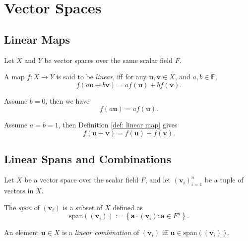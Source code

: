 
\chapter{Vector Spaces}


\section{Linear Maps}



\begin{definition}
	\label{def: linear map}
	Let $X$ and $Y$ be vector spaces over the same scalar field $F$.
	
	A map $f: X \to Y$ is said to be \textit{linear}, iff for any $\mathbf u, \mathbf v \in X$, and $a, b \in \mathbb F$,
	$$
	f(a\mathbf u + b\mathbf v) = a f(\mathbf u) + b f(\mathbf v).
	$$
\end{definition}



\begin{note}
	Assume $b = 0$, then we have
	$$
	f(a\mathbf u) = a f(\mathbf u).
	$$

	Assume $a = b = 1$, then Definition \ref{def: linear map} gives
	$$
	f(\mathbf u + \mathbf v) = f(\mathbf u) + f(\mathbf v).
	$$	
\end{note}





\section{Linear Spans and Combinations}


\begin{definition}
	\label{def: span and combination}
	Let $X$ be a vector space over the scalar field $F$, and let $(\mathbf v_i)_{i = 1}^n$ be a tuple of vectors in $X$.
	
	The \textit{span} of $(\mathbf v_i)$ is a subset of $X$ defined as
	$$
	\mathrm{span}((\mathbf v_i)) := \left\{ \mathbf a \cdot (\mathbf v_i) : \mathbf a \in F^n \right\}.
	$$
	
	An element $\mathbf u \in X$ is a \textit{linear combination} of $(\mathbf v_i)$ iff $\mathbf u \in \mathrm{span}((\mathbf v_i))$.
\end{definition}


